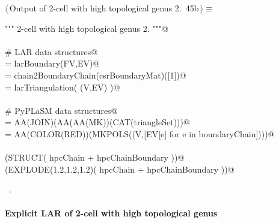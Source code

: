 \documentclass[11pt,oneside]{article}    %
\begin{document}
\begin{flushleft} \small \label{scrap76}
\protect{}$\langle\,$Output of 2-cell with high topological genus 2.\nobreak\ {\footnotesize 45b}$\,\rangle\equiv$
\vspace{-1ex}
\begin{list}{}{} \item
\mbox{}\verb@""" 2-cell with high topological genus 2. """@\\
\mbox{}\verb@@\\
\mbox{}\verb@# LAR data structures@\\
\mbox{}\verb@csrBoundaryMat = larBoundary(FV,EV)@\\
\mbox{}\verb@boundaryChain = chain2BoundaryChain(csrBoundaryMat)([1])@\\
\mbox{}\verb@triangleSet = larTriangulation( (V,EV) )@\\
\mbox{}\verb@@\\
\mbox{}\verb@# PyPLaSM data structures@\\
\mbox{}\verb@hpcChain = AA(JOIN)(AA(AA(MK))(CAT(triangleSet)))@\\
\mbox{}\verb@hpcChainBoundary = AA(COLOR(RED))(MKPOLS((V,[EV[e] for e in boundaryChain])))@\\
\mbox{}\verb@@\\
\mbox{}\verb@VIEW(STRUCT( hpcChain + hpcChainBoundary ))@\\
\mbox{}\verb@VIEW(EXPLODE(1.2,1.2,1.2)( hpcChain + hpcChainBoundary ))@\\
\mbox{}\verb@@{\NWsep}
\end{list}
\vspace{-1ex}
\footnotesize\addtolength{\baselineskip}{-1ex}
\begin{list}{}{\setlength{\itemsep}{-\parsep}\setlength{\itemindent}{-\leftmargin}}
\item \NWtxtMacroRefIn\ .
\end{list}
\end{flushleft}

\paragraph{Explicit LAR of 2-cell with high topological genus}
\end{document}
